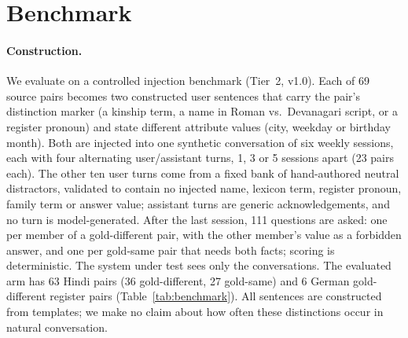 \section{Benchmark}
\label{sec:benchmark}

\paragraph{Construction.} We evaluate on a controlled injection benchmark (Tier~2, v1.0). Each of 69 source pairs becomes two constructed
user sentences that carry the pair's distinction marker (a kinship term, a name in Roman vs.\ Devanagari script, or a register pronoun)
and state different attribute values (city, weekday or birthday month). Both are injected into one synthetic conversation of six weekly
sessions, each with four alternating user/assistant turns, 1, 3 or 5 sessions apart (23 pairs each). The other ten user turns come from a
fixed bank of hand-authored neutral distractors, validated to contain no injected name, lexicon term, register pronoun, family term or
answer value; assistant turns are generic acknowledgements, and no turn is model-generated. After the last session, 111 questions are
asked: one per member of a gold-different pair, with the other member's value as a forbidden answer, and one per gold-same pair that needs
both facts; scoring is deterministic. The system under test sees only the conversations. The evaluated arm has 63 Hindi pairs (36
gold-different, 27 gold-same) and 6 German gold-different register pairs (Table~\ref{tab:benchmark}). All sentences are constructed from
templates; we make no claim about how often these distinctions occur in natural conversation.


